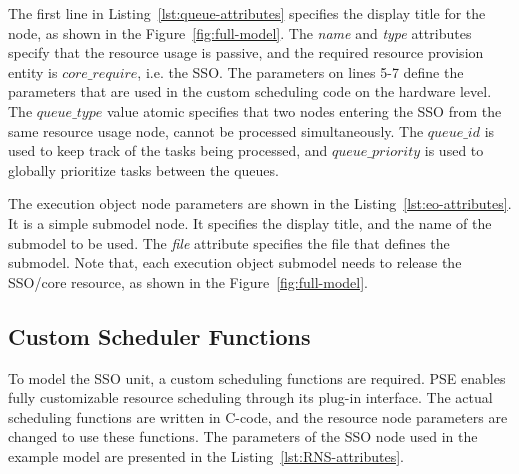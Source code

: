 The first line in Listing~\ref{lst:queue-attributes} specifies the display title for the node, as shown in the Figure~\ref{fig:full-model}. The \emph{name} and \emph{type} attributes specify that the resource usage is passive, and the required resource provision entity is $core\_require$, i.e. the SSO. The parameters on lines 5-7 define the parameters that are used in the custom scheduling code on the hardware level. The \emph{$queue\_type$} value atomic specifies that two nodes entering the SSO from the same resource usage node, cannot be processed simultaneously. The \emph{$queue\_id$} is used to keep track of the tasks being processed, and \emph{$queue\_priority$} is used to globally prioritize tasks between the queues.



The execution object node parameters are shown in the Listing~\ref{lst:eo-attributes}. It is a simple submodel node. It specifies the display title, and the name of the submodel to be used. The \emph{file} attribute specifies the file that defines the submodel. Note that, each execution object submodel needs to release the SSO/core resource, as shown in the Figure~\ref{fig:full-model}.

\subsection{Custom Scheduler Functions}
\label{sec:custom-scheduler-functions}



To model the SSO unit, a custom scheduling functions are required. PSE enables fully customizable resource scheduling through its plug-in interface. The actual scheduling functions are written in C-code, and the resource node parameters are changed to use these functions. The parameters of the SSO node used in the example model are presented in the Listing~\ref{lst:RNS-attributes}.

